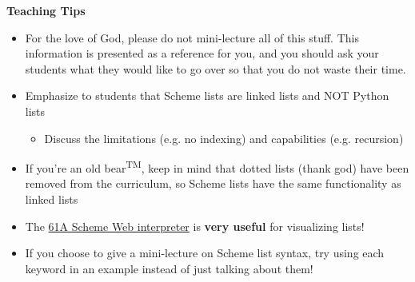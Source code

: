 \begin{guide}
\begin{blocksection}
\textbf{Teaching Tips}
\begin{itemize}
  \item For the love of God, please do not mini-lecture all of this stuff. This information is presented as a reference for you, and you should ask your students what they would like to go over so that you do not waste their time. 
  \item Emphasize to students that Scheme lists are linked lists and NOT Python lists
  \begin{itemize}
    \item Discuss the limitations (e.g. no indexing) and capabilities (e.g. recursion)
  \end{itemize}
  \item If you're an old bear\textsuperscript{TM}, keep in mind that dotted lists (thank god) have been removed from the curriculum, so Scheme lists have the same functionality as linked lists
  \item The \href{https://code.cs61a.org/}{61A Scheme Web interpreter} is \textbf{very useful} for visualizing lists!
  \item If you choose to give a mini-lecture on Scheme list syntax, try using each keyword in an example instead of just talking about them!
\end{itemize}
\end{blocksection}
\end{guide}

